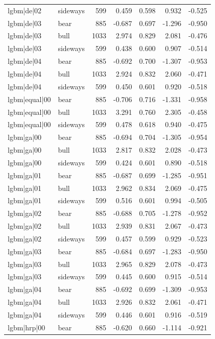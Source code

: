 \begin{table}
\begin{tabular}{llrrrrr}
lgbm|de|02 & sideways & 599 & 0.459 & 0.598 & 0.932 & -0.525 \\
lgbm|de|03 & bear & 885 & -0.687 & 0.697 & -1.296 & -0.950 \\
lgbm|de|03 & bull & 1033 & 2.974 & 0.829 & 2.081 & -0.476 \\
lgbm|de|03 & sideways & 599 & 0.438 & 0.600 & 0.907 & -0.514 \\
lgbm|de|04 & bear & 885 & -0.692 & 0.700 & -1.307 & -0.953 \\
lgbm|de|04 & bull & 1033 & 2.924 & 0.832 & 2.060 & -0.471 \\
lgbm|de|04 & sideways & 599 & 0.450 & 0.601 & 0.920 & -0.518 \\
lgbm|equal|00 & bear & 885 & -0.706 & 0.716 & -1.331 & -0.958 \\
lgbm|equal|00 & bull & 1033 & 3.291 & 0.760 & 2.305 & -0.458 \\
lgbm|equal|00 & sideways & 599 & 0.478 & 0.618 & 0.940 & -0.475 \\
lgbm|ga|00 & bear & 885 & -0.694 & 0.704 & -1.305 & -0.954 \\
lgbm|ga|00 & bull & 1033 & 2.817 & 0.832 & 2.028 & -0.473 \\
lgbm|ga|00 & sideways & 599 & 0.424 & 0.601 & 0.890 & -0.518 \\
lgbm|ga|01 & bear & 885 & -0.687 & 0.699 & -1.285 & -0.951 \\
lgbm|ga|01 & bull & 1033 & 2.962 & 0.834 & 2.069 & -0.475 \\
lgbm|ga|01 & sideways & 599 & 0.516 & 0.601 & 0.994 & -0.505 \\
lgbm|ga|02 & bear & 885 & -0.688 & 0.705 & -1.278 & -0.952 \\
lgbm|ga|02 & bull & 1033 & 2.939 & 0.831 & 2.067 & -0.473 \\
lgbm|ga|02 & sideways & 599 & 0.457 & 0.599 & 0.929 & -0.523 \\
lgbm|ga|03 & bear & 885 & -0.684 & 0.697 & -1.283 & -0.950 \\
lgbm|ga|03 & bull & 1033 & 2.965 & 0.829 & 2.078 & -0.473 \\
lgbm|ga|03 & sideways & 599 & 0.445 & 0.600 & 0.915 & -0.514 \\
lgbm|ga|04 & bear & 885 & -0.692 & 0.699 & -1.309 & -0.953 \\
lgbm|ga|04 & bull & 1033 & 2.926 & 0.832 & 2.061 & -0.471 \\
lgbm|ga|04 & sideways & 599 & 0.446 & 0.601 & 0.916 & -0.519 \\
lgbm|hrp|00 & bear & 885 & -0.620 & 0.660 & -1.114 & -0.921 \\

\end{tabular}
\end{table}
